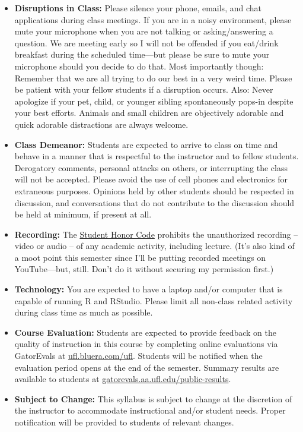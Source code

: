 \documentclass[11pt]{article}
\begin{document}
\begin{itemize}
	\item \textbf{Disruptions in Class:} Please silence your phone, emails, and chat applications during class meetings. If you are in a noisy environment, please mute your microphone when you are not talking or asking/answering a question. We are meeting early so I will not be offended if you eat/drink breakfast during the scheduled time---but please be sure to mute your microphone should you decide to do that. Most importantly though: Remember that we are all trying to do our best in a very weird time. Please be patient with your fellow students if a disruption occurs. Also: Never apologize if your pet, child, or younger sibling spontaneously pops-in despite your best efforts. Animals and small children are objectively adorable and quick adorable distractions are always welcome. 
	\item \textbf{Class Demeanor:} Students are expected to arrive to class on time and behave in a manner that is respectful to the instructor and to fellow students. Derogatory comments, personal attacks on others, or interrupting the class will not be accepted. Please avoid the use of cell phones and electronics for extraneous purposes. Opinions held by other students should be respected in discussion, and conversations that do not contribute to the discussion should be held at minimum, if present at all.
	\item \textbf{Recording:} The {\href{https://sccr.dso.ufl.edu/policies/student-honor-code-student-conduct-code/}{Student Honor Code}} prohibits the unauthorized recording -- video or audio -- of any academic activity, including lecture. (It's also kind of a moot point this semester since I'll be putting recorded meetings on YouTube---but, still. Don't do it without securing my permission first.)
	\item \textbf{Technology:} You are expected to have a laptop and/or computer that is capable of running R and RStudio. Please limit all non-class related activity during class time as much as possible.
	\item \textbf{Course Evaluation:} Students are expected to provide feedback on the quality of instruction in this course by completing online evaluations via GatorEvals at {\href{https://ufl.bluera.com/ufl/}{ufl.bluera.com/ufl}}. Students will be notified when the evaluation period opens at the end of the semester. Summary results are available to students at {\href{https://gatorevals.aa.ufl.edu/public-results/}{gatorevals.aa.ufl.edu/public-results}}.
	\item \textbf{Subject to Change:} This syllabus is subject to change at the discretion of the instructor to accommodate instructional and/or student needs. Proper notification will be provided to students of relevant changes.
	\end{itemize}
\end{document}
